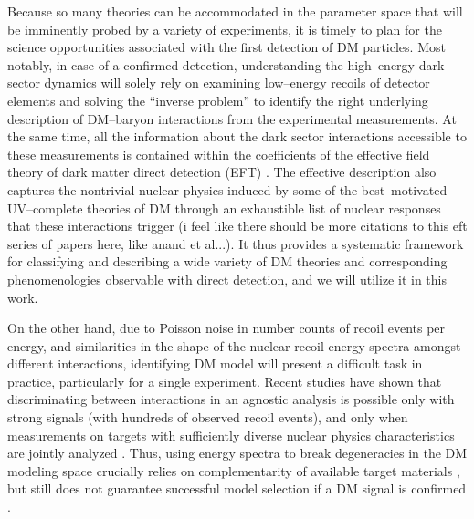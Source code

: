 \documentclass[11pt]{article}
\newcommand{\vgColor}{magenta}
\newcommand{\vg}[1]{{\color{\vgColor} #1}}
\begin{document}
Because so many theories can be accommodated in the parameter space that will be imminently probed by a variety of experiments, it is timely to plan for the science opportunities associated with the first detection of DM particles. Most notably, in case of a confirmed detection, understanding the high--energy dark sector dynamics will solely rely on examining low--energy recoils of detector elements and solving the ``inverse problem'' to identify the right underlying description of DM--baryon interactions from the experimental measurements. At the same time, all the information about the dark sector interactions accessible to these measurements is contained within the coefficients of the effective field theory of dark matter direct detection (EFT) \cite{Fitzpatrick:2012ix, Anand:2013yka}. The effective description also captures the nontrivial nuclear physics induced by some of the best--motivated UV--complete theories of DM \cite{Gresham:2014vja, Gluscevic:2015sqa} through an exhaustible list of nuclear responses that these interactions trigger \vg{(i feel like there should be more citations to this eft series of papers here, like anand et al...)}. It thus provides a systematic framework for classifying and describing a wide variety of DM theories and corresponding phenomenologies observable with direct detection, and we will utilize it in this work. 
 
On the other hand, due to Poisson noise in number counts of recoil events per energy, and similarities in the shape of the nuclear-recoil-energy spectra amongst different interactions, identifying  DM model will present a difficult task in practice, particularly for a single experiment. Recent studies have shown that discriminating between interactions in an agnostic analysis is possible only with strong signals (with hundreds of observed recoil events), and only when measurements on targets with sufficiently diverse nuclear physics characteristics are jointly analyzed \cite{Gluscevic:2014vga,Gluscevic:2015sqa}. Thus, using energy spectra to break degeneracies in the DM modeling space crucially relies on complementarity of available target materials \cite{McDermott:2011hx,Peter:2013aha,Gluscevic:2014vga,Catena:2014epa,Catena:2014hla,Dent:2015zpa,Gluscevic:2015sqa,Ruppin:2014bra}, but still does not guarantee successful model selection if a DM signal is confirmed \cite{Gluscevic:2014vga,Gluscevic:2015sqa}.
\end{document}
